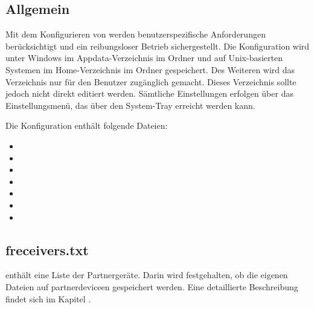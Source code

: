 \subsection{Allgemein}
Mit dem Konfigurieren von \sblit werden benutzerspezifische Anforderungen berücksichtigt und ein reibungsloser Betrieb sichergestellt. Die Konfiguration wird unter Windows im Appdata-Verzeichnis im Ordner  und auf Unix-basierten Systemen im Home-Verzeichnis im Ordner  gespeichert. Des Weiteren wird das Verzeichnis nur für den Benutzer zugänglich gemacht. Dieses Verzeichnis sollte jedoch nicht direkt editiert werden. Sämtliche Einstellungen erfolgen über das Einstellungsmenü, das über den System-Tray erreicht werden kann.

Die Konfiguration enthält folgende Dateien:
\begin{itemize}
	\item {}
	\item {}
	\item {}
	\item {}
	\item {}
	\item {}
	\item {}
\end{itemize}
\subsection{freceivers.txt} \label{freceiverstxt}
 enthält eine Liste der Partnergeräte. Darin wird festgehalten, ob die eigenen Dateien auf \gls{partnerdevice}en gespeichert werden. Eine detaillierte Beschreibung findet sich im Kapitel .

